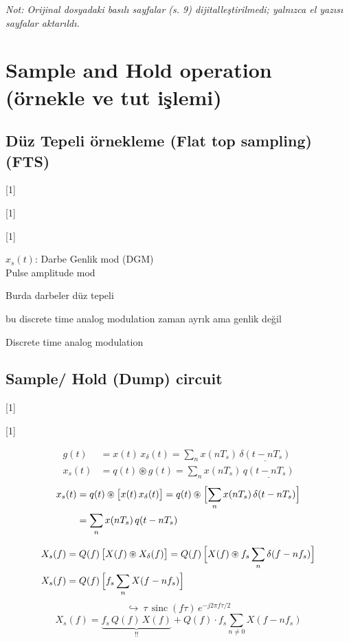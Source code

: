 \documentclass[11pt,a4paper]{article}
\begin{document}
\textit{Not: Orijinal dosyadaki basılı sayfalar (s. 9) dijitalleştirilmedi; yalnızca el yazısı sayfalar aktarıldı.}

\section{Sample and Hold operation (örnekle ve tut işlemi)}

\subsection{Düz Tepeli örnekleme (Flat top sampling) (FTS)}

[1]

[1]

[1]

$x_s(t)$: Darbe Genlik mod (DGM)\\
\hspace*{2em}Pulse amplitude mod

Burda darbeler düz tepeli

bu discrete time analog modulation \quad zaman ayrık ama genlik değil

Discrete time analog modulation

\subsection{Sample/ Hold (Dump) circuit}

[1]

[1]

\begin{align*}
g(t) &= x(t)\, x_\delta(t) = \sum_n x(nT_s)\, \underline{\delta(t-nT_s)}\\
x_s(t) &= q(t) \circledast g(t) = \sum_n x(nT_s)\, \underline{q(t-nT_s)}
\end{align*}
\begin{align*}
x_s(t) &= q(t) \circledast \bigl[x(t)\, x_\delta(t)\bigr] = q(t) \circledast \Bigl[\sum_n x(nT_s)\,\delta(t-nT_s)\Bigr]\\
&= \sum_n x(nT_s)\, q(t-nT_s)
\end{align*}

\begin{align*}
X_s(f) &= Q(f)\,\bigl[X(f) \circledast X_\delta(f)\bigr] = Q(f)\,\Bigl[X(f) \circledast f_s \sum_n \delta(f-nf_s)\Bigr]\\
X_s(f) &= Q(f)\,\Bigl[f_s \sum_n X(f-nf_s)\Bigr]
\end{align*}
\[ \hookrightarrow\ \tau\,\operatorname{sinc}(f\tau)\, e^{-j2\pi f \tau/2} \]
\[ X_s(f) = \underbrace{f_s\, Q(f)\, X(f)}_{!!} + Q(f)\cdot f_s \sum_{n\neq 0} X(f-nf_s) \]
\end{document}
